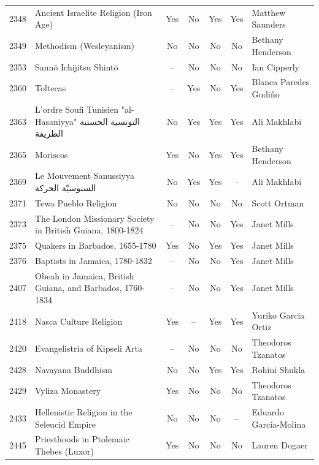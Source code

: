 {\begin{longtable}{rp{3.5cm}ccccp{3cm}}
2348 & {\raggedright Ancient Israelite Religion (Iron Age)} & Yes & No & Yes & Yes & {\raggedright Matthew Saunders} \\
2349 & {\raggedright Methodism (Wesleyanism)} & No & No & No & No & {\raggedright Bethany Henderson} \\
2353 & {\raggedright Sannō Ichijitsu Shintō} & -- & No & No & No & {\raggedright Ian Cipperly} \\
2360 & {\raggedright Toltecas} & -- & Yes & No & Yes & {\raggedright Blanca Paredes Gudiño} \\
2363 & {\raggedright L'ordre Soufi Tunisien "al-Hasaniyya" {\arabicfont التونسية الحسنية الطريقة}} & No & Yes & Yes & Yes & {\raggedright Ali Makhlabi} \\
2365 & {\raggedright Moriscos} & Yes & No & Yes & Yes & {\raggedright Bethany Henderson} \\
2369 & {\raggedright Le Mouvement Sanussiyya {\arabicfont السنوسيّة الحركة}} & No & Yes & Yes & -- & {\raggedright Ali Makhlabi} \\
2371 & {\raggedright Tewa Pueblo Religion} & No & No & No & No & {\raggedright Scott Ortman} \\
2373 & {\raggedright The London Missionary Society in British Guiana, 1800-1824} & -- & No & No & Yes & {\raggedright Janet Mills} \\
2375 & {\raggedright Quakers in Barbados, 1655-1780} & Yes & No & Yes & Yes & {\raggedright Janet Mills} \\
2376 & {\raggedright Baptists in Jamaica, 1780-1832} & -- & No & No & Yes & {\raggedright Janet Mills} \\
2407 & {\raggedright Obeah in Jamaica, British Guiana, and Barbados, 1760-1834} & -- & No & No & Yes & {\raggedright Janet Mills} \\
2418 & {\raggedright Nasca Culture Religion} & Yes & -- & Yes & Yes & {\raggedright Yuriko Garcia Ortiz} \\
2420 & {\raggedright Evangelistria of Kipseli Arta} & -- & No & No & No & {\raggedright Theodoros Tzanatos} \\
2428 & {\raggedright Navayana Buddhism} & No & No & Yes & Yes & {\raggedright Rohini Shukla} \\
2429 & {\raggedright Vyliza Monastery} & Yes & No & No & No & {\raggedright Theodoros Tzanatos} \\
2433 & {\raggedright Hellenistic Religion in the Seleucid Empire} & No & No & No & -- & {\raggedright Eduardo García-Molina} \\
2445 & {\raggedright Priesthoods in Ptolemaic Thebes (Luxor)} & Yes & No & No & No & {\raggedright Lauren Dogaer} \\

\end{longtable}}

